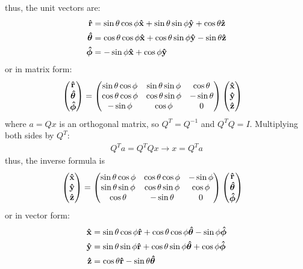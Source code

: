 \documentclass[../main.tex]{subfiles}
\begin{document}
thus, the unit vectors are:
\begin{align*}
    \vu{r} &= \sin\theta \cos\phi\vu{x} + \sin\theta \sin\phi\vu{y} + \cos\theta \vu{z} \\
    \vu*{\theta} &= \cos\theta \cos\phi\vu{x} + \cos\theta \sin\phi\vu{y} - \sin\theta \vu{z} \\
    \vu*{\phi} &= -\sin\phi\vu{x} + \cos\phi\vu{y}
\end{align*}
or in matrix form:
\begin{align*}
    \mqty(
        \vu{r} \\
        \vu*{\theta} \\
        \vu*{\phi}
    ) &=
    \begin{pmatrix}
        \sin\theta \cos\phi & \sin\theta \sin\phi & \cos\theta \\
        \cos\theta \cos\phi & \cos\theta \sin\phi & -\sin\theta \\
        -\sin\phi           & \cos\phi            & 0 
    \end{pmatrix}
    \mqty(
        \vu{x} \\
        \vu{y} \\
        \vu{z}
    )
\end{align*}
where $a = Qx$ is an orthogonal matrix, so $Q^T = Q^{-1}$ and $Q^T Q = I$. Multiplying both
sides by $Q^T$:
\begin{align*}
    Q^T a = Q^T Q x \to x = Q^T a
\end{align*}
thus, the inverse formula is
\begin{align*}
    \mqty(
        \vu{x} \\
        \vu{y} \\
        \vu{z}
    ) &=
    \begin{pmatrix}
        \sin\theta \cos\phi & \cos\theta \cos\phi & -\sin\phi \\
        \sin\theta \sin\phi & \cos\theta \sin\phi & \cos\phi \\
        \cos\theta          & -\sin\theta         & 0 
    \end{pmatrix}
    \mqty(
        \vu{r} \\
        \vu*{\theta} \\
        \vu*{\phi}
    )
\end{align*}
or in vector form:
\begin{align*}
    \vu{x} &= \sin\theta \cos\phi \vu{r} + \cos\theta \cos\phi \vu*{\theta} - \sin\phi \vu*{\phi} \\
    \vu{y} &= \sin\theta \sin\phi \vu{r} + \cos\theta \sin\phi \vu*{\theta} + \cos\phi \vu*{\phi} \\
    \vu{z} &= \cos\theta \vu{r} - \sin\theta \vu*{\theta}
\end{align*}
\end{document}
